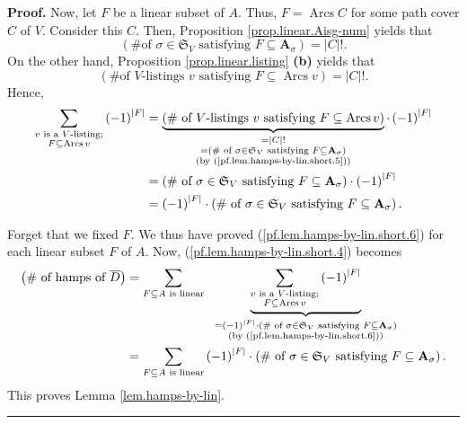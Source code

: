 \documentclass[numbers=enddot,12pt,final,onecolumn,notitlepage]{scrartcl}%
\numberwithin{exer}{section}
\theoremstyle{definition}
\newenvironment{proof}[1][Proof]{\noindent\textbf{#1.} }{\ \rule{0.5em}{0.5em}}
\let\sumnonlimits\sum
\renewcommand{\sum}{\sumnonlimits\limits}
\newenvironment{vershort}{}{}
\begin{document}
\begin{vershort}
\begin{proof}
Now, let $F$ be a linear subset of $A$. Thus, $F=\operatorname*{Arcs}C$ for
some path cover $C$ of $V$. Consider this $C$. Then, Proposition
\ref{prop.linear.Aisg-num} yields that%
\begin{equation}
\left(  \text{\# of }\sigma\in\mathfrak{S}_{V}\text{ satisfying }%
F\subseteq\mathbf{A}_{\sigma}\right)  =\left\vert C\right\vert !.
\label{pf.lem.hamps-by-lin.short.5}%
\end{equation}
On the other hand, Proposition \ref{prop.linear.listing} \textbf{(b)} yields
that
\[
\left(  \text{\# of }V\text{-listings }v\text{ satisfying }F\subseteq
\operatorname*{Arcs}v\right)  =\left\vert C\right\vert !.
\]
Hence,%
\begin{align}
\sum_{\substack{v\text{ is a }V\text{-listing;}\\F\subseteq
\operatorname*{Arcs}v}}\left(  -1\right)  ^{\left\vert F\right\vert }  &
=\underbrace{\left(  \text{\# of }V\text{-listings }v\text{ satisfying
}F\subseteq\operatorname*{Arcs}v\right)  }_{\substack{=\left\vert C\right\vert
!\\=\left(  \text{\# of }\sigma\in\mathfrak{S}_{V}\text{ satisfying
}F\subseteq\mathbf{A}_{\sigma}\right)  \\\text{(by
(\ref{pf.lem.hamps-by-lin.short.5}))}}}\cdot\left(  -1\right)  ^{\left\vert
F\right\vert }\nonumber\\
&  =\left(  \text{\# of }\sigma\in\mathfrak{S}_{V}\text{ satisfying
}F\subseteq\mathbf{A}_{\sigma}\right)  \cdot\left(  -1\right)  ^{\left\vert
F\right\vert }\nonumber\\
&  =\left(  -1\right)  ^{\left\vert F\right\vert }\cdot\left(  \text{\# of
}\sigma\in\mathfrak{S}_{V}\text{ satisfying }F\subseteq\mathbf{A}_{\sigma
}\right)  . \label{pf.lem.hamps-by-lin.short.6}%
\end{align}


Forget that we fixed $F$. We thus have proved
(\ref{pf.lem.hamps-by-lin.short.6}) for each linear subset $F$ of $A$. Now,
(\ref{pf.lem.hamps-by-lin.short.4}) becomes%
\begin{align*}
\left(  \text{\# of hamps of }\overline{D}\right)   &  =\sum_{F\subseteq
A\text{ is linear}}\ \ \underbrace{\sum_{\substack{v\text{ is a }%
V\text{-listing;}\\F\subseteq\operatorname*{Arcs}v}}\left(  -1\right)
^{\left\vert F\right\vert }}_{\substack{=\left(  -1\right)  ^{\left\vert
F\right\vert }\cdot\left(  \text{\# of }\sigma\in\mathfrak{S}_{V}\text{
satisfying }F\subseteq\mathbf{A}_{\sigma}\right)  \\\text{(by
(\ref{pf.lem.hamps-by-lin.short.6}))}}}\\
&  =\sum_{F\subseteq A\text{ is linear}}\left(  -1\right)  ^{\left\vert
F\right\vert }\cdot\left(  \text{\# of }\sigma\in\mathfrak{S}_{V}\text{
satisfying }F\subseteq\mathbf{A}_{\sigma}\right)  .
\end{align*}
This proves Lemma \ref{lem.hamps-by-lin}.
\end{proof}
\end{vershort}
\end{document}
